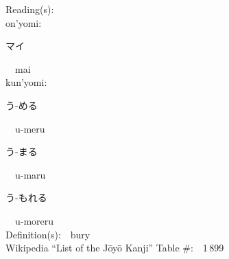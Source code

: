 \begin{multicols}{2}
Reading(s):\ \ \\
{\hspace*{1em}}on'yomi:\ \ \\
{\hspace*{2em}}{\begin{CJK}{UTF8}{min} マイ \end{CJK}}\ \ mai\ \ \\
{\hspace*{1em}}kun'yomi:\ \ \\
{\hspace*{2em}}{\begin{CJK}{UTF8}{min} う-める \end{CJK}}\ \ u-meru\ \ \\
{\hspace*{2em}}{\begin{CJK}{UTF8}{min} う-まる \end{CJK}}\ \ u-maru\ \ \\
{\hspace*{2em}}{\begin{CJK}{UTF8}{min} う-もれる \end{CJK}}\ \ u-moreru\ \ \\
Definition(s):\ \ bury \\
Wikipedia ``List of the J\=oy\=o Kanji'' Table \#:\ \ 1\,899 \\
\ \ \\
\end{multicols}



